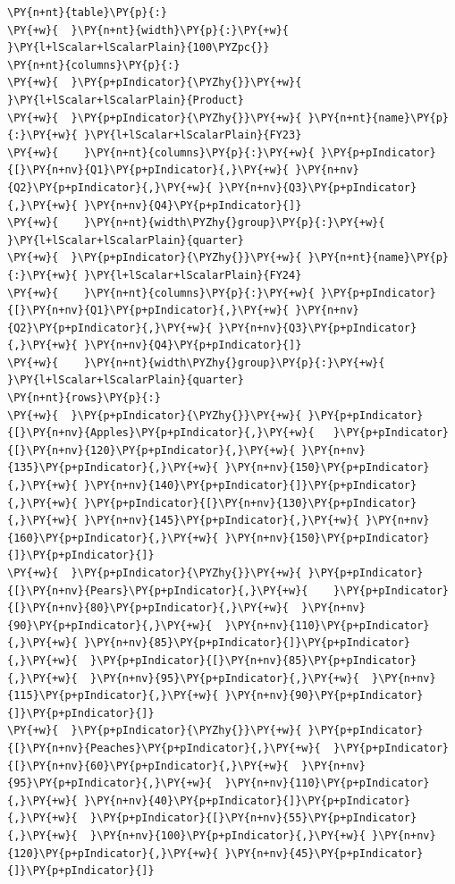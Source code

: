 \documentclass[a4paper,twoside]{article}
\begin{document}
\begin{tscode}[lang=yaml, engine=pygments]
\begin{Verbatim}[commandchars=\\\{\},breaklines, breakanywhere, commandchars=\\\{\}]
\PY{n+nt}{table}\PY{p}{:}
\PY{+w}{  }\PY{n+nt}{width}\PY{p}{:}\PY{+w}{ }\PY{l+lScalar+lScalarPlain}{100\PYZpc{}}
\PY{n+nt}{columns}\PY{p}{:}
\PY{+w}{  }\PY{p+pIndicator}{\PYZhy{}}\PY{+w}{ }\PY{l+lScalar+lScalarPlain}{Product}
\PY{+w}{  }\PY{p+pIndicator}{\PYZhy{}}\PY{+w}{ }\PY{n+nt}{name}\PY{p}{:}\PY{+w}{ }\PY{l+lScalar+lScalarPlain}{FY23}
\PY{+w}{    }\PY{n+nt}{columns}\PY{p}{:}\PY{+w}{ }\PY{p+pIndicator}{[}\PY{n+nv}{Q1}\PY{p+pIndicator}{,}\PY{+w}{ }\PY{n+nv}{Q2}\PY{p+pIndicator}{,}\PY{+w}{ }\PY{n+nv}{Q3}\PY{p+pIndicator}{,}\PY{+w}{ }\PY{n+nv}{Q4}\PY{p+pIndicator}{]}
\PY{+w}{    }\PY{n+nt}{width\PYZhy{}group}\PY{p}{:}\PY{+w}{ }\PY{l+lScalar+lScalarPlain}{quarter}
\PY{+w}{  }\PY{p+pIndicator}{\PYZhy{}}\PY{+w}{ }\PY{n+nt}{name}\PY{p}{:}\PY{+w}{ }\PY{l+lScalar+lScalarPlain}{FY24}
\PY{+w}{    }\PY{n+nt}{columns}\PY{p}{:}\PY{+w}{ }\PY{p+pIndicator}{[}\PY{n+nv}{Q1}\PY{p+pIndicator}{,}\PY{+w}{ }\PY{n+nv}{Q2}\PY{p+pIndicator}{,}\PY{+w}{ }\PY{n+nv}{Q3}\PY{p+pIndicator}{,}\PY{+w}{ }\PY{n+nv}{Q4}\PY{p+pIndicator}{]}
\PY{+w}{    }\PY{n+nt}{width\PYZhy{}group}\PY{p}{:}\PY{+w}{ }\PY{l+lScalar+lScalarPlain}{quarter}
\PY{n+nt}{rows}\PY{p}{:}
\PY{+w}{  }\PY{p+pIndicator}{\PYZhy{}}\PY{+w}{ }\PY{p+pIndicator}{[}\PY{n+nv}{Apples}\PY{p+pIndicator}{,}\PY{+w}{   }\PY{p+pIndicator}{[}\PY{n+nv}{120}\PY{p+pIndicator}{,}\PY{+w}{ }\PY{n+nv}{135}\PY{p+pIndicator}{,}\PY{+w}{ }\PY{n+nv}{150}\PY{p+pIndicator}{,}\PY{+w}{ }\PY{n+nv}{140}\PY{p+pIndicator}{]}\PY{p+pIndicator}{,}\PY{+w}{ }\PY{p+pIndicator}{[}\PY{n+nv}{130}\PY{p+pIndicator}{,}\PY{+w}{ }\PY{n+nv}{145}\PY{p+pIndicator}{,}\PY{+w}{ }\PY{n+nv}{160}\PY{p+pIndicator}{,}\PY{+w}{ }\PY{n+nv}{150}\PY{p+pIndicator}{]}\PY{p+pIndicator}{]}
\PY{+w}{  }\PY{p+pIndicator}{\PYZhy{}}\PY{+w}{ }\PY{p+pIndicator}{[}\PY{n+nv}{Pears}\PY{p+pIndicator}{,}\PY{+w}{    }\PY{p+pIndicator}{[}\PY{n+nv}{80}\PY{p+pIndicator}{,}\PY{+w}{  }\PY{n+nv}{90}\PY{p+pIndicator}{,}\PY{+w}{  }\PY{n+nv}{110}\PY{p+pIndicator}{,}\PY{+w}{ }\PY{n+nv}{85}\PY{p+pIndicator}{]}\PY{p+pIndicator}{,}\PY{+w}{  }\PY{p+pIndicator}{[}\PY{n+nv}{85}\PY{p+pIndicator}{,}\PY{+w}{  }\PY{n+nv}{95}\PY{p+pIndicator}{,}\PY{+w}{  }\PY{n+nv}{115}\PY{p+pIndicator}{,}\PY{+w}{ }\PY{n+nv}{90}\PY{p+pIndicator}{]}\PY{p+pIndicator}{]}
\PY{+w}{  }\PY{p+pIndicator}{\PYZhy{}}\PY{+w}{ }\PY{p+pIndicator}{[}\PY{n+nv}{Peaches}\PY{p+pIndicator}{,}\PY{+w}{  }\PY{p+pIndicator}{[}\PY{n+nv}{60}\PY{p+pIndicator}{,}\PY{+w}{  }\PY{n+nv}{95}\PY{p+pIndicator}{,}\PY{+w}{  }\PY{n+nv}{110}\PY{p+pIndicator}{,}\PY{+w}{ }\PY{n+nv}{40}\PY{p+pIndicator}{]}\PY{p+pIndicator}{,}\PY{+w}{  }\PY{p+pIndicator}{[}\PY{n+nv}{55}\PY{p+pIndicator}{,}\PY{+w}{  }\PY{n+nv}{100}\PY{p+pIndicator}{,}\PY{+w}{ }\PY{n+nv}{120}\PY{p+pIndicator}{,}\PY{+w}{ }\PY{n+nv}{45}\PY{p+pIndicator}{]}\PY{p+pIndicator}{]}

\end{Verbatim}
\end{tscode}
\end{document}
